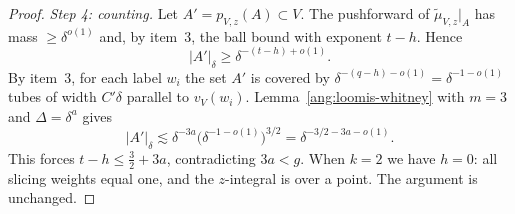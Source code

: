 \documentclass[11pt,reqno]{amsart}
\begin{document}
\begin{proof}
\emph{Step 4: counting.} Let $A'=p_{V,z}(A)\subset V$. The pushforward of $\widetilde\mu_{V,z}|_A$ has mass $\ge\delta^{o(1)}$ and, by item~3, the ball bound with exponent $t-h$. Hence
\[
 |A'|_\delta\ge\delta^{-(t-h)+o(1)}.
\]
By item~3, for each label $w_i$ the set $A'$ is covered by $\delta^{-(q-h)-o(1)}=\delta^{-1-o(1)}$ tubes of width $C'\delta$ parallel to $v_V(w_i)$. Lemma~\ref{ang:loomis-whitney} with $m=3$ and $\Delta=\delta^a$ gives
\[
 |A'|_\delta\lesssim\delta^{-3a}\bigl(\delta^{-1-o(1)}\bigr)^{3/2}=\delta^{-3/2-3a-o(1)}.
\]
This forces $t-h\le\frac32+3a$, contradicting $3a<g$. When $k=2$ we have $h=0$: all slicing weights equal one, and the $z$-integral is over a point. The argument is unchanged.
\end{proof}
\end{document}
